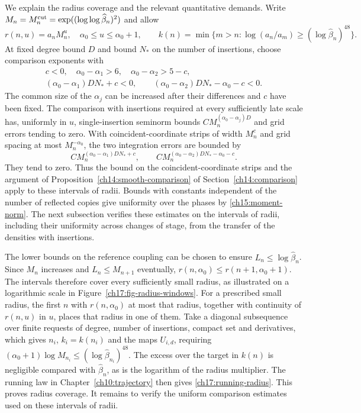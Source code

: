 We explain the radius coverage and the relevant quantitative demands.
Write $M_n=M_n^{\rm cut}=\exp((\log\log\widehat\beta_n)^2)$ and
allow
\[
 r(n,u)=a_nM_n^u,\quad \alpha_0\le u\le\alpha_0+1,\qquad
 k(n)=\min\{m>n:\log(a_n/a_m)\ge(\log\widehat\beta_n)^{48}\}.
\]
At fixed degree bound $D$ and bound $N_*$ on the number of insertions, choose comparison
exponents with
\begin{gather*}
 c<0,\quad\alpha_0-\alpha_1>6,\quad
 \alpha_0-\alpha_2>5-c,\\
 (\alpha_0-\alpha_1)DN_*+c<0,\qquad
 (\alpha_0-\alpha_2)DN_*-\alpha_0-c<0.
\end{gather*}
The common size of the $\alpha_j$ can be increased after their
differences and $c$ have been fixed. The comparison with insertions required
at every sufficiently late scale has, uniformly in $u$, single-insertion
seminorm bounds $CM_n^{(\alpha_0-\alpha_j)D}$ and grid errors tending
to zero. With coincident-coordinate strips of width $M_n^c$ and grid spacing at most
$M_n^{-\alpha_0}$, the two integration errors are bounded by
\[
 C M_n^{(\alpha_0-\alpha_1)DN_*+c},\qquad
 C M_n^{(\alpha_0-\alpha_2)DN_*-\alpha_0-c}.
\]
They tend to zero. Thus the bound on the coincident-coordinate strips and the argument of Proposition~\ref{ch14:smooth-comparison}
of Section~\ref{ch14:comparison} apply to these intervals of radii.
Bounds with constants independent of the number of reflected copies give uniformity over the phases by
\eqref{ch15:moment-norm}. The next subsection verifies these estimates on the intervals of radii, including their
uniformity across changes of stage, from the transfer of the densities with insertions.

The lower bounds on the reference coupling can be chosen to ensure $L_n\le\log\widehat\beta_n$.
Since $M_n$ increases and $L_n\le M_{n+1}$ eventually,
$r(n,\alpha_0)\le r(n+1,\alpha_0+1)$. The intervals therefore
cover every sufficiently small radius, as illustrated on a logarithmic
scale in Figure~\ref{ch17:fig-radius-windows}. For a prescribed small radius, the first $n$ with $r(n,\alpha_0)$ at most that radius, together with continuity of $r(n,u)$ in $u$, places
that radius in one of them. Take a diagonal subsequence over finite requests of degree, number of insertions,
compact set and derivatives, which gives $n_i$, $k_i=k(n_i)$ and the maps $U_{i,d}$, requiring
$(\alpha_0+1)\log M_{n_i}\le(\log\widehat\beta_{n_i})^{48}$.
The excess over the target in $k(n)$ is negligible compared with
$\widehat\beta_n$, as is the logarithm of the radius multiplier.
The running law in Chapter~\ref{ch10:trajectory} then gives
\eqref{ch17:running-radius}. This proves radius coverage. It remains to verify the uniform
comparison estimates used on these intervals of radii.

